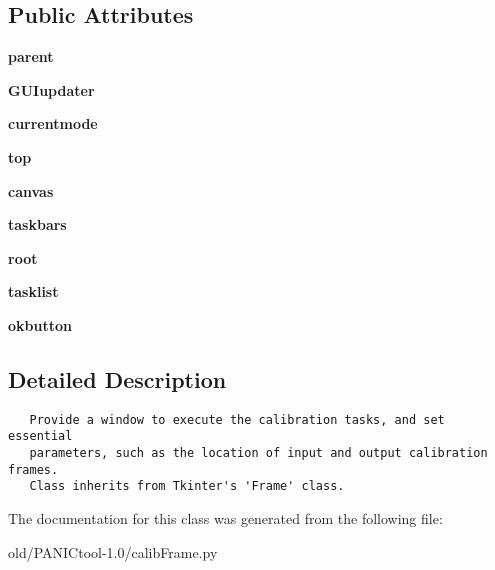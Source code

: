 \subsection*{Public Attributes}
\begin{CompactItemize}
\item 
\textbf{parent}\label{classcalibFrame_1_1window_c64247a7e8b90f7764680240f50cb4c7}

\item 
\textbf{GUIupdater}\label{classcalibFrame_1_1window_7f9296ebe6da5230ab7b4de296428370}

\item 
\textbf{currentmode}\label{classcalibFrame_1_1window_663fd2c07f8b2dc2a6a645cc843bbd67}

\item 
\textbf{top}\label{classcalibFrame_1_1window_3b56e2c64bb8977dc7a589574a6389d7}

\item 
\textbf{canvas}\label{classcalibFrame_1_1window_e345e475f537a04b88cfe3fd7e74fd37}

\item 
\textbf{taskbars}\label{classcalibFrame_1_1window_8f422bd67539d5dd05a4ccf6b2730e6f}

\item 
\textbf{root}\label{classcalibFrame_1_1window_98b27aa8b89dee2381d31e2d4e602745}

\item 
\textbf{tasklist}\label{classcalibFrame_1_1window_12d912bad2e3542c6d8845408904e639}

\item 
\textbf{okbutton}\label{classcalibFrame_1_1window_59212a8b98a820ef63c92bb8aa49d533}

\end{CompactItemize}


\subsection{Detailed Description}


\footnotesize\begin{verbatim}
   Provide a window to execute the calibration tasks, and set essential
   parameters, such as the location of input and output calibration frames.
   Class inherits from Tkinter's 'Frame' class.
\end{verbatim}
\normalsize
 



The documentation for this class was generated from the following file:\begin{CompactItemize}
\item 
old/PANICtool-1.0/calib\-Frame.py\end{CompactItemize}
